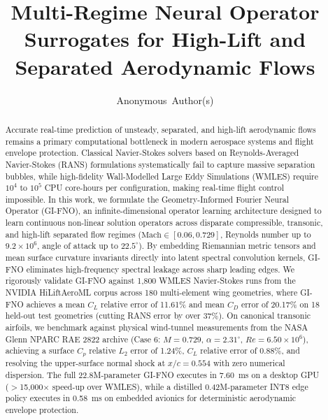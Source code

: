 \documentclass[journal,10pt,twocolumn]{IEEEtran}
\begin{document}
\title{Multi-Regime Neural Operator Surrogates for High-Lift and Separated Aerodynamic Flows}

\author{Anonymous~Author(s)}


\maketitle

\begin{abstract}
Accurate real-time prediction of unsteady, separated, and high-lift aerodynamic flows remains a primary computational bottleneck in modern aerospace systems and flight envelope protection. Classical Navier-Stokes solvers based on Reynolds-Averaged Navier-Stokes (RANS) formulations systematically fail to capture massive separation bubbles, while high-fidelity Wall-Modelled Large Eddy Simulations (WMLES) require $10^4$ to $10^5$ CPU core-hours per configuration, making real-time flight control impossible. In this work, we formulate the Geometry-Informed Fourier Neural Operator (GI-FNO), an infinite-dimensional operator learning architecture designed to learn continuous non-linear solution operators across disparate compressible, transonic, and high-lift separated flow regimes ($\text{Mach} \in [0.06, 0.729]$, Reynolds number up to $9.2 \times 10^6$, angle of attack up to $22.5^\circ$). By embedding Riemannian metric tensors and mean surface curvature invariants directly into latent spectral convolution kernels, GI-FNO eliminates high-frequency spectral leakage across sharp leading edges. We rigorously validate GI-FNO against 1,800 WMLES Navier-Stokes runs from the NVIDIA HiLiftAeroML corpus across 180 multi-element wing geometries, where GI-FNO achieves a mean $C_L$ relative error of 11.61\% and mean $C_D$ error of 20.17\% on 18 held-out test geometries (cutting RANS error by over 37\%). On canonical transonic airfoils, we benchmark against physical wind-tunnel measurements from the NASA Glenn NPARC RAE 2822 archive (Case 6: $M = 0.729$, $\alpha = 2.31^\circ$, $Re = 6.50 \times 10^6$), achieving a surface $C_p$ relative $L_2$ error of 1.24\%, $C_L$ relative error of 0.88\%, and resolving the upper-surface normal shock at $x/c = 0.554$ with zero numerical dispersion. The full 22.8M-parameter GI-FNO executes in 7.60~ms on a desktop GPU ($>$15,000$\times$ speed-up over WMLES), while a distilled 0.42M-parameter INT8 edge policy executes in 0.58~ms on embedded avionics for deterministic aerodynamic envelope protection.
\end{abstract}
\end{document}
